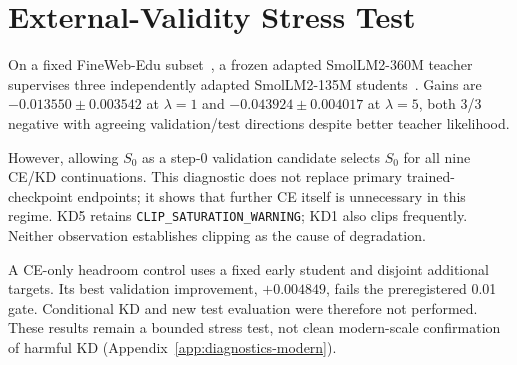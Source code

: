 \section{External-Validity Stress Test}\label{sec:external-validity}

On a fixed FineWeb-Edu subset~\citep{penedo2024fineweb}, a frozen adapted SmolLM2-360M teacher supervises three independently adapted SmolLM2-135M students~\citep{benallal2025smollm2}. Gains are $-0.013550\pm0.003542$ at $\lambda=1$ and $-0.043924\pm0.004017$ at $\lambda=5$, both 3/3 negative with agreeing validation/test directions despite better teacher likelihood.

However, allowing $S_0$ as a step-0 validation candidate selects $S_0$ for all nine CE/KD continuations. This diagnostic does not replace primary trained-checkpoint endpoints; it shows that further CE itself is unnecessary in this regime. KD5 retains \texttt{CLIP\_SATURATION\_WARNING}; KD1 also clips frequently. Neither observation establishes clipping as the cause of degradation.

A CE-only headroom control uses a fixed early student and disjoint additional targets. Its best validation improvement, $+0.004849$, fails the preregistered 0.01 gate. Conditional KD and new test evaluation were therefore not performed. These results remain a bounded stress test, not clean modern-scale confirmation of harmful KD (Appendix~\ref{app:diagnostics-modern}).
